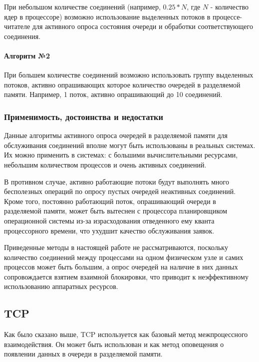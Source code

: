 При небольшом количестве соединений (например, $0.25 * N$, где $N$ - количество ядер в процессоре) возможно использование выделенных потоков в процессе-читателе для активного опроса состояния очереди и обработки соответствующего соединения. %

\paragraph{Алгоритм №2}

При большем количестве соединений возможно использовать группу выделенных потоков, активно опрашивающих которое количество очередей в разделяемой памяти. Например, 1 поток, активно опрашивающий до 10 соединений.

\subsubsection{Применимость, достоинства и недостатки}\label{chapter31:NaivePolling}

Данные алгоритмы активного опроса очередей в разделяемой памяти для обслуживания соединений вполне могут быть использованы в реальных системах. Их можно применить в системах: с большими вычислительными ресурсами, небольшим количеством процессов и очень активных соединений.

В противном случае, активно работающие потоки будут выполнять много бесполезных операций по опросу пустых очередей неактивных соединений. Кроме того, постоянно работающий поток, опрашивающий очереди в разделяемой памяти, может быть вытеснен с процессора планировщиком операционной системы из-за израсходования отведенного ему кванта процессорного времени, что ухудшит качество обслуживания заявок.

Приведенные методы в настоящей работе не рассматриваются, поскольку количество соединений между процессами на одном физическом узле и самих процессов может быть большим, а опрос очередей на наличие в них данных сопровождается взятием взаимной блокировки, что приводит к неэффективному использованию аппаратных ресурсов.

\subsection{TCP}\label{chapter31:SignalTCP}

Как было сказано выше, TCP используется как базовый метод межпроцессного взаимодействия. Он может быть использован и как метод оповещения о появлении данных в очереди в разделяемой памяти.

